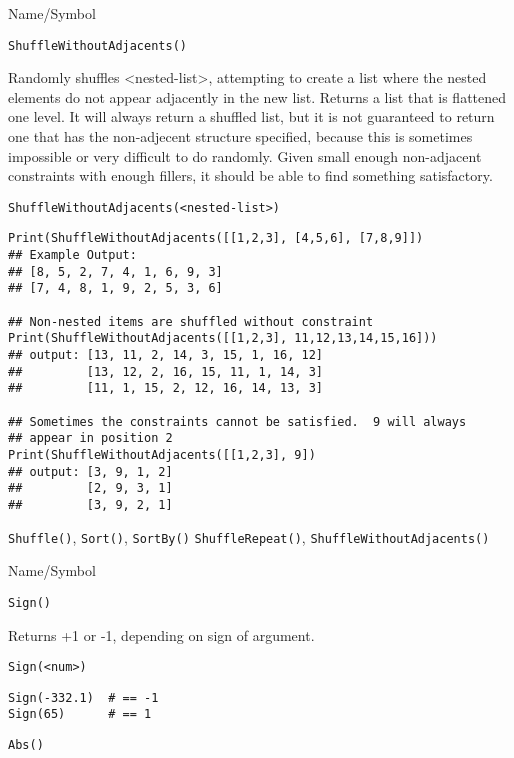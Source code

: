 \begin{desc}{Name/Symbol}
\item[Name/Symbol] 	\verb+ShuffleWithoutAdjacents()+

\item[Description] 	Randomly shuffles  <nested-list>, attempting to
  create a list where the nested elements do not appear adjacently in
  the new list. Returns a list that is flattened one level. It will
  always return a shuffled list, but it is not guaranteed to return
  one that has the non-adjecent structure specified, because this is
  sometimes impossible or very difficult to do randomly.  Given small
  enough non-adjacent constraints with enough fillers, it should be
  able to find something satisfactory.

\item[Usage]    
\begin{verbatim}
ShuffleWithoutAdjacents(<nested-list>)
\end{verbatim}

\item[Example]
\begin{verbatim}
Print(ShuffleWithoutAdjacents([[1,2,3], [4,5,6], [7,8,9]])
## Example Output: 
## [8, 5, 2, 7, 4, 1, 6, 9, 3]
## [7, 4, 8, 1, 9, 2, 5, 3, 6]

## Non-nested items are shuffled without constraint
Print(ShuffleWithoutAdjacents([[1,2,3], 11,12,13,14,15,16]))
## output: [13, 11, 2, 14, 3, 15, 1, 16, 12]
##         [13, 12, 2, 16, 15, 11, 1, 14, 3]
##         [11, 1, 15, 2, 12, 16, 14, 13, 3]

## Sometimes the constraints cannot be satisfied.  9 will always
## appear in position 2
Print(ShuffleWithoutAdjacents([[1,2,3], 9])
## output: [3, 9, 1, 2]
##         [2, 9, 3, 1]
##         [3, 9, 2, 1]

   \end{verbatim}

\item[See Also]    	\verb+Shuffle()+, \verb+Sort()+, \verb+SortBy()+
        \verb+ShuffleRepeat()+, \verb+ShuffleWithoutAdjacents()+
\end{desc}

\rl


\begin{desc}{Name/Symbol}
\item[Name/Symbol] 	\verb+Sign()+

\item[Description] 	Returns +1 or -1, depending on sign of argument.

\item[Usage]
\begin{verbatim}
Sign(<num>)
\end{verbatim}

\item[Example]
\begin{verbatim}
Sign(-332.1)  # == -1
Sign(65)      # == 1

\end{verbatim}

\item[See Also]     	\verb+Abs()+
\end{desc}

